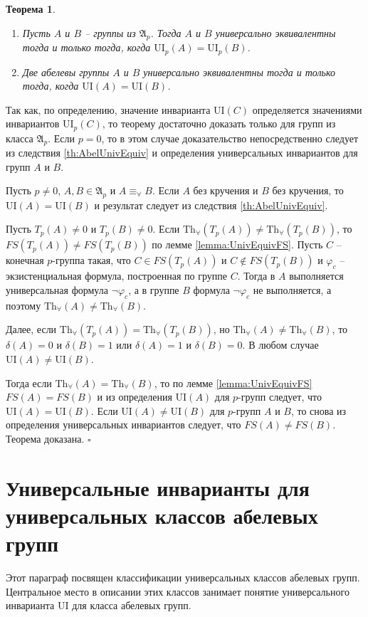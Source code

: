 \documentclass[a4paper,11pt,twoside]{article}
\newtheorem{theorem}{Теорема}[section]
\def\proof{{\noindent{\bf Доказательство.}} }
\def\A{{\mathfrak{A}}}
\def\Tha{{\mathrm{Th}_\forall}}
\def\ui{{\mathrm{UI}}}
\begin{document}
\begin{theorem}\label{th:UnivEquivOfGroups}
\begin{enumerate}
\item Пусть $A$ и $B$ -- группы из $\A_p$. Тогда $A$ и $B$ универсально эквивалентны тогда и только тогда, когда $\ui_p(A) = \ui_p(B)$.
\item Две абелевы группы $A$ и $B$ универсально эквивалентны тогда и только тогда, когда $\ui(A) = \ui(B)$.
\end{enumerate}
\end{theorem}


\proof Так как, по определению, значение инварианта $\ui(C)$ определяется значениями инвариантов $\ui_p(C)$, то теорему достаточно доказать только для групп из класса $\A_p$. Если $p=0$, то в этом случае доказательство непосредственно следует из следствия \ref{th:AbelUnivEquiv} и определения универсальных инвариантов для групп $A$ и $B$.

Пусть $p \neq 0$, $A, B \in \A_p$ и $A \equiv_\forall B$. Если $A$ без кручения и $B$ без кручения, то $\ui(A) = \ui(B)$ и результат следует из следствия \ref{th:AbelUnivEquiv}.

Пусть $T_p(A) \neq 0$ и $T_p(B) \neq 0$. Если $\Tha(T_p(A)) \neq \Tha(T_p(B))$, то $FS(T_p(A)) \neq FS(T_p(B))$ по лемме \ref{lemma:UnivEquivFS}. Пусть $C$ -- конечная $p$-группа такая, что $C \in FS(T_p(A))$ и $C \notin FS(T_p(B))$ и $\varphi_c$ -- экзистенциальная формула, построенная по группе $C$. Тогда в $A$ выполняется универсальная формула $\neg \varphi_c$, а в группе $B$ формула $\neg \varphi_c$ не выполняется, а поэтому $\Tha(A) \neq \Tha(B)$.

Далее, если $\Tha(T_p(A)) = \Tha(T_p(B))$, но $\Tha(A) \neq \Tha(B)$, то $\delta(A) = 0$ и $\delta(B) = 1$ или $\delta(A) = 1$ и $\delta(B) = 0$. В любом случае $\ui(A) \neq \ui(B)$. 

Тогда если $\Tha(A) = \Tha(B)$, то по лемме \ref{lemma:UnivEquivFS} $FS(A) = FS(B)$ и из определения $\ui(A)$ для $p$-групп следует, что $\ui(A) = \ui(B)$. Если $\ui(A) \neq \ui(B)$ для $p$-групп $A$ и $B$, то снова из определения универсальных инвариантов следует, что $FS(A) \neq FS(B)$. Теорема доказана. $\square$


\section{Универсальные инварианты для универсальных классов абелевых групп}

Этот параграф посвящен классификации универсальных классов абелевых групп. Центральное место в описании этих классов занимает понятие универсального инварианта $\ui$ для класса абелевых групп. 
\end{document}
